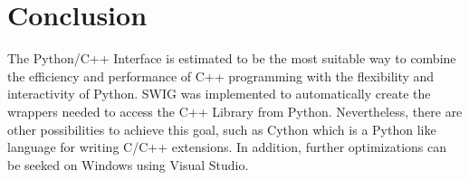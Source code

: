 \chapter{Conclusion}

The Python/C++ Interface is estimated to be the most suitable way to combine the efficiency and performance of C++ programming with the flexibility and interactivity of Python. SWIG was implemented to automatically create the wrappers needed to access the C++ Library from Python. Nevertheless, there are other possibilities to achieve this goal, such as Cython which is a Python like language for writing C/C++ extensions. In addition, further optimizations can be seeked on Windows using Visual Studio.
